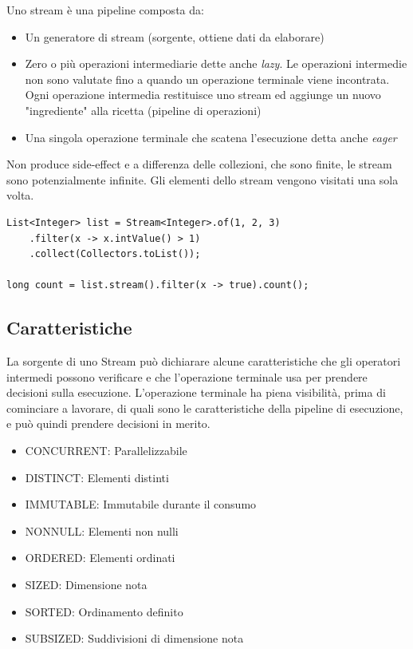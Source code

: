 Uno stream è una pipeline composta da:
\begin{itemize}
	\item Un generatore di stream (sorgente, ottiene dati da elaborare)
	\item Zero o pi\`u operazioni intermediarie dette anche \textit{lazy}. Le operazioni intermedie non sono valutate fino a quando un operazione terminale viene incontrata. Ogni operazione intermedia restituisce uno stream ed aggiunge un nuovo "ingrediente" alla ricetta (pipeline di operazioni)
	\item Una singola operazione terminale che scatena l'esecuzione detta anche \textit{eager}
\end{itemize}

Non produce side-effect e a differenza delle collezioni, che sono finite, le stream sono potenzialmente infinite. Gli elementi dello stream vengono visitati una sola volta.

\begin{lstlisting}
List<Integer> list = Stream<Integer>.of(1, 2, 3)
	.filter(x -> x.intValue() > 1)
	.collect(Collectors.toList());

long count = list.stream().filter(x -> true).count();
\end{lstlisting}

\subsection{Caratteristiche}

La sorgente di uno Stream pu\`o dichiarare alcune caratteristiche che gli operatori intermedi possono verificare e che l'operazione terminale usa per prendere decisioni sulla esecuzione. L'operazione terminale ha piena visibilit\`a, prima di cominciare a lavorare, di quali sono le caratteristiche della pipeline di esecuzione, e pu\`o quindi prendere decisioni in merito.

\begin{itemize}
	\item CONCURRENT:	Parallelizzabile
	\item DISTINCT:	Elementi distinti
	\item IMMUTABLE:	Immutabile durante il consumo
	\item NONNULL:	Elementi non nulli
	\item ORDERED:	Elementi ordinati
	\item SIZED:	Dimensione nota
	\item SORTED:	Ordinamento definito
	\item SUBSIZED:	Suddivisioni di dimensione nota
\end{itemize}

